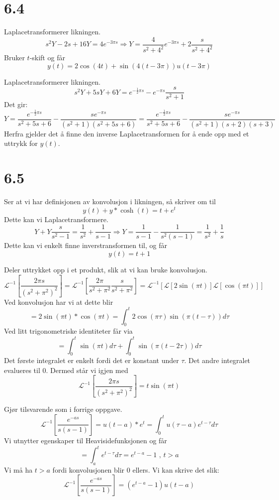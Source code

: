 \documentclass[11pt, a4paper, norsk]{NTNUoving}
\begin{document}
\section*{6.4}
\begin{oppgave}[4]
  Laplacetransformerer likningen.
  \[
    s^{2}Y-2s+16Y=4e^{-3\pi s}\Rightarrow Y=\frac{4}{s^{2}+4^{2}}e^{-3\pi s}+2\frac{s}{s^{2}+4^{2}}
  \]
  Bruker $t$-skift og får
  \[
    y(t)=2\cos(4t)+\sin(4(t-3\pi))u(t-3\pi)
  \]
\end{oppgave}
\begin{oppgave}[10]
Laplacetransformerer likningen.
\[
  s^{2}Y+5sY+6Y=e^{-\frac{1}{2}\pi s}-e^{-\pi s}\frac{s}{s^{2}+1}
\]
Det gir:
\[
  Y=\frac{e^{-\frac{1}{2}\pi s}}{s^{2}+5s+6}-\frac{s e^{-\pi s}}{(s^{2}+1)(s^{2}+5s+6)} =
  \frac{e^{-\frac{1}{2}\pi s}}{s^{2}+5s+6}-\frac{s e^{-\pi s}}{(s^{2}+1)(s+2)(s+3)}
\]
Herfra gjelder det å finne den inverse Laplacetransformen for å ende opp med et uttrykk for $y(t)$.
\end{oppgave}
\section*{6.5}
\begin{oppgave}[12]
  Ser at vi har definisjonen av konvolusjon i likningen, så skriver om til
  \[
    y(t)+y*\cosh(t)=t+e^{t}
  \]
  Dette kan vi Laplacetransformere.
  \[
    Y+Y\frac{s}{s^{2}-1}=\frac{1}{s^{2}}+\frac{1}{s-1}\Rightarrow Y=\frac{1}{s-1}-\frac{1}{s^{2}(s-1)}=\frac{1}{s^{2}}+\frac{1}{s}
  \]
  Dette kan vi enkelt finne inverstransformen til, og får
  \[
    y(t) = t+1
  \]
\end{oppgave}
\begin{oppgave}[19]
  Deler uttrykket opp i et produkt, slik at vi kan bruke konvolusjon.
  \[
    \mathscr{L}^{-1}\left[\frac{2\pi s}{(s^{2}+\pi^{2})^{2}}\right]
    = \mathscr{L}^{-1}\left[\frac{2\pi}{s^{2}+\pi^{2}}\frac{s}{s^{2}+\pi^{2}}\right]
    = \mathscr{L}^{-1}[\mathscr{L}[2\sin(\pi t)] \mathscr{L}[\cos(\pi t)]]
  \]
  Ved konvolusjon har vi at dette blir
  \[
    = 2\sin(\pi t)*\cos(\pi t) = \int_{0}^{t}2\cos(\pi\tau)\sin(\pi(t-\tau))d\tau
  \]
  Ved litt trigonometriske identiteter får via
  \[
    = \int_{0}^{t}\sin(\pi t)d\tau + \int_{0}^{t}\sin(\pi(t-2\tau))d\tau
  \]
  Det første integralet er enkelt fordi det er konstant under $\tau$. Det andre integralet evalueres til 0. Dermed står vi igjen med
  \[
    \mathscr{L}^{-1}\left[\frac{2\pi s}{(s^{2}+\pi^{2})^{2}}\right]
    = t\sin(\pi t)
  \]
\end{oppgave}
\begin{oppgave}[22]
  Gjør tilsvarende som i forrige oppgave.
  \[
    \mathscr{L}^{-1}\left[\frac{e^{-as}}{s(s-1)}\right] = u(t-a)*e^{t}
    = \int_{0}^{t}u(\tau-a)e^{t-\tau}d\tau
  \]
  Vi utnytter egenskaper til Heavisidefunksjonen og får
  \[
    =\int_{a}^{t}e^{t-\tau}d\tau=e^{t-a}-1 \text{  ,  } t>a
  \]
  Vi må ha $t>a$ fordi konvolusjonen blir 0 ellers. Vi kan skrive det slik:
  \[
    \mathscr{L}^{-1}\left[\frac{e^{-as}}{s(s-1)}\right]
    =(e^{t-a}-1)u(t-a)
  \]
\end{oppgave}
\end{document}
